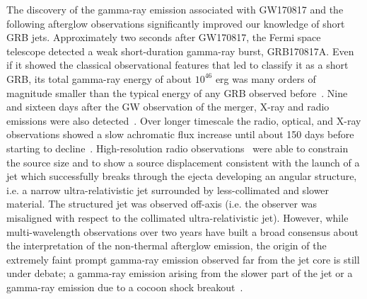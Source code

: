 The discovery of the gamma-ray emission  associated with GW170817 and the following afterglow observations significantly improved our knowledge of short GRB jets.
Approximately two seconds after GW170817, the Fermi space telescope detected a weak short-duration gamma-ray burst, GRB170817A. Even if it showed the classical observational features that led to classify it as a short GRB, its total gamma-ray energy of about $10^{46}$ erg was many orders of magnitude smaller than the typical energy of any GRB observed before~\citep{Goldstein:2017mmi,Savchenko:2017ffs}. Nine and sixteen days after the  GW observation of the merger, X-ray and radio emissions were also detected~\citep{Troja:2017,Hallinan:2017}. Over longer timescale the radio, optical, and X-ray observations showed a slow achromatic flux increase until about 150 days before starting to decline~\citep{Lamb:2018qfn,Dobie2018,Davanzo2018,Margutti2018}. High-resolution radio observations~\citep{Ghirlanda:2019,Mooley:2018} were able to constrain the source size and to show a source displacement consistent with the launch of a jet which successfully breaks through the ejecta developing an angular structure, i.e. a narrow ultra-relativistic jet surrounded by less-collimated and slower material. The  structured jet was observed off-axis (i.e. the observer was misaligned with respect to the collimated ultra-relativistic jet). However, while multi-wavelength observations over two years have built a broad consensus about the interpretation of the non-thermal afterglow emission, the origin of the extremely faint prompt gamma-ray emission observed far from the jet core is still under debate; a gamma-ray emission arising from the slower part of the jet or a gamma-ray emission due to a cocoon shock breakout~\citep[see e.g.,][]{Beniami2019,Salafia2019,Kathirgamaraju2018,Nakar2018,Kasliwal2017}.

